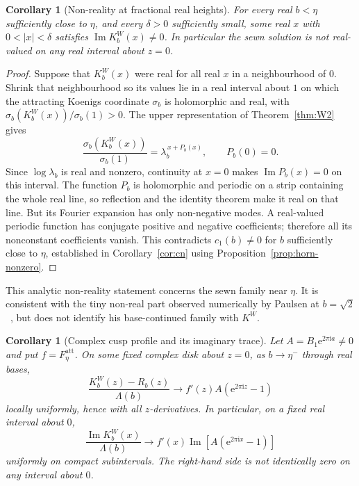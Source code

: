 \documentclass[11pt,a4paper]{article}
\newtheorem{corollary}[theorem]{Corollary}
\theoremstyle{definition}
\newcommand{\Rr}{R}
\newcommand{\Kk}{K}
\newcommand{\eee}{\mathrm{e}}
\newcommand{\ii}{\mathrm{i}}
\begin{document}
\begin{corollary}[Non-reality at fractional real heights]
\label{cor:sewn-nonreal}
For every real $b<\eta$ sufficiently close to $\eta$, and every
$\delta>0$ sufficiently small, some real $x$ with $0<|x|<\delta$
satisfies $\operatorname{Im}\Kk_b^W(x)\ne0$.  In particular the sewn
solution is not real-valued on any real interval about $z=0$.
\end{corollary}

\begin{proof}
Suppose that $\Kk_b^W(x)$ were real for all real $x$ in a neighbourhood
of $0$.  Shrink that neighbourhood so its values lie in a real interval
about $1$ on which the attracting Koenigs coordinate $\sigma_b$ is
holomorphic and real, with $\sigma_b(\Kk_b^W(x))/\sigma_b(1)>0$.
The upper representation of Theorem~\ref{thm:W2} gives
\[
 \frac{\sigma_b(\Kk_b^W(x))}{\sigma_b(1)}
   =\lambda_b^{\,x+P_b(x)},\qquad P_b(0)=0.
\]
Since $\log\lambda_b$ is real and nonzero, continuity at $x=0$ makes
$\operatorname{Im}P_b(x)=0$ on this interval.  The function $P_b$ is
holomorphic and periodic on a strip containing the whole real line,
so reflection and the identity theorem make it real on that line.
But its Fourier expansion has only non-negative modes.  A real-valued
periodic function has conjugate positive and negative coefficients;
therefore all its nonconstant coefficients vanish.  This contradicts
$c_1(b)\ne0$ for $b$ sufficiently close to $\eta$, established in
Corollary~\ref{cor:cn} using Proposition~\ref{prop:horn-nonzero}.
\end{proof}

This analytic non-reality statement concerns the sewn family near $\eta$.
It is consistent with the tiny non-real part observed numerically by
Paulsen at $b=\sqrt2$~\cite[\S6]{Paulsen2019}, but does not identify his
base-continued family with $\Kk^W$.

\begin{corollary}[Complex cusp profile and its imaginary trace]
\label{cor:imaginary-profile}
Let $A=B_1\eee^{2\pi\ii a}\ne0$ and put $f=F_\eta^{\mathrm{att}}$.
On some fixed complex disk about $z=0$, as $b\to\eta^-$ through real bases,
\[
 \frac{\Kk_b^W(z)-\Rr_b(z)}{\Lambda(b)}
 \longrightarrow f'(z)A(\eee^{2\pi\ii z}-1)
\]
locally uniformly, hence with all $z$-derivatives.  In particular, on
a fixed real interval about $0$,
\[
 \frac{\operatorname{Im}\Kk_b^W(x)}{\Lambda(b)}
 \longrightarrow
 f'(x)
   \operatorname{Im}\!\left[A(\eee^{2\pi\ii x}-1)\right]
\]
uniformly on compact subintervals.  The right-hand side is not
identically zero on any interval about $0$.
\end{corollary}
\end{document}
